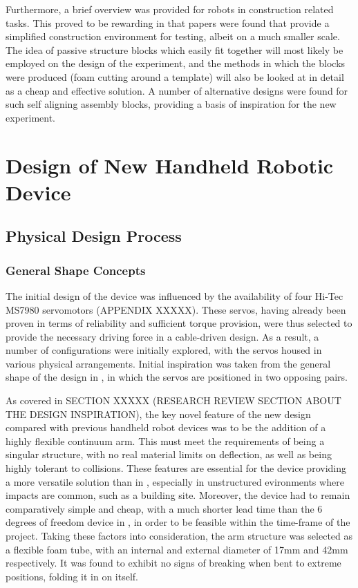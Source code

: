 \documentclass[11pt]{article}
\begin{document}
Furthermore, a brief overview was provided for robots in construction related tasks. This proved to be rewarding in that papers were found that provide a simplified construction environment for testing, albeit on a much smaller scale. The idea of passive structure blocks which easily fit together will most likely be employed on the design of the experiment, and the methods in which the blocks were produced (foam cutting around a template) will also be looked at in detail as a cheap and effective solution. A number of alternative designs were found for such self aligning assembly blocks, providing a basis of inspiration for the new experiment.


\pagebreak
\pagebreak

\section{Design of New Handheld Robotic Device}

\subsection{Physical Design Process}
\subsubsection{General Shape Concepts}
The initial design of the device was influenced by the availability of four Hi-Tec MS7980 servomotors (APPENDIX XXXXX). These servos, having already been proven in terms of reliability and sufficient torque provision, were thus selected to provide the necessary driving force in a cable-driven design. As a result, a number of configurations were initially explored, with the servos housed in various physical arrangements. Initial inspiration was taken from the general shape of the design in \cite{GreggSmithDesign}, in which the servos are positioned in two opposing pairs.

As covered in SECTION XXXXX (RESEARCH REVIEW SECTION ABOUT THE DESIGN INSPIRATION), the key novel feature of the new design compared with previous handheld robot devices was to be the addition of a highly flexible continuum arm. This must meet the requirements of being a singular structure, with no real material limits on deflection, as well as being highly tolerant to collisions. These features are essential for the device providing a more versatile solution than in \cite{GreggSmithDesign}, especially in unstructured evironments where impacts are common, such as a building site. Moreover, the device had to remain comparatively simple and cheap, with a much shorter lead time than the 6 degrees of freedom device in \cite{GreggSmithKinematics}, in order to be feasible within the time-frame of the project. Taking these factors into consideration, the arm structure was selected as a flexible foam tube, with an internal and external diameter of 17mm and 42mm respectively. It was found to exhibit no signs of breaking when bent to extreme positions, folding it in on itself.
\end{document}

